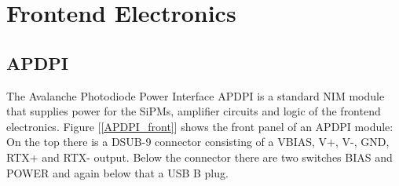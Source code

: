 \section{Frontend Electronics}
\subsection{APDPI}

The Avalanche Photodiode Power Interface APDPI is a standard NIM module that supplies power for the SiPMs, amplifier circuits and logic of the frontend electronics.
Figure [\ref{APDPI_front}] shows the front panel of an APDPI module: On the top there is a DSUB-9 connector consisting of a VBIAS, V+, V-, GND, RTX+ and RTX- output.
Below the connector there are two switches BIAS and POWER and again below that a USB B plug.

